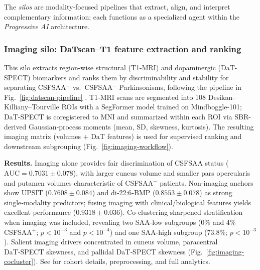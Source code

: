 \documentclass[11pt]{article}
\begin{document}
The \emph{silos} are modality-focused pipelines that extract, align, and interpret complementary information; each functions as a specialized agent within the \emph{Progressive AI} architecture.

\subsubsection{Imaging silo: DaTscan--T1 feature extraction and ranking}
This silo extracts region-wise structural (T1-MRI) and dopaminergic (DaT-SPECT) biomarkers and ranks them by discriminability and stability for separating CSFSAA$^+$ vs.\ CSFSAA$^-$ Parkinsonisms, following the pipeline in Fig.~\ref{fig:datscan-pipeline} \cite{dominick2025brain}. T1-MRI scans are segmented into 108 Desikan--Killiany--Tourville ROIs with a SegFormer model trained on Mindboggle-101; DaT-SPECT is coregistered to MNI and summarized within each ROI via SBR-derived Gaussian‑process moments (mean, SD, skewness, kurtosis). The resulting imaging matrix (volumes + DaT features) is used for supervised ranking and downstream subgrouping (Fig.~\ref{fig:imaging-workflow}).

\textbf{Results.} Imaging alone provides fair discrimination of CSFSAA status ($\mathrm{AUC}=0.7031\pm0.078$), with larger cuneus volume and smaller pars opercularis and putamen volumes characteristic of CSFSAA$^-$ patients. Non‑imaging anchors show UPSIT ($0.7608\pm0.084$) and di‑22{:}6‑BMP ($0.8553\pm0.078$) as strong single‑modality predictors; fusing imaging with clinical/biological features yields excellent performance ($0.9318\pm0.036$). Co‑clustering sharpened stratification when imaging was included, revealing two SAA‑low subgroups (0\% and 4\% CSFSAA$^+$; $p<10^{-3}$ and $p<10^{-4}$) and one SAA‑high subgroup (73.8\%; $p<10^{-3}$). Salient imaging drivers concentrated in cuneus volume, paracentral DaT‑SPECT skewness, and pallidal DaT‑SPECT skewness (Fig.~\ref{fig:imaging-cocluster}). See \cite{dominick2025brain} for cohort details, preprocessing, and full analytics.
\end{document}
